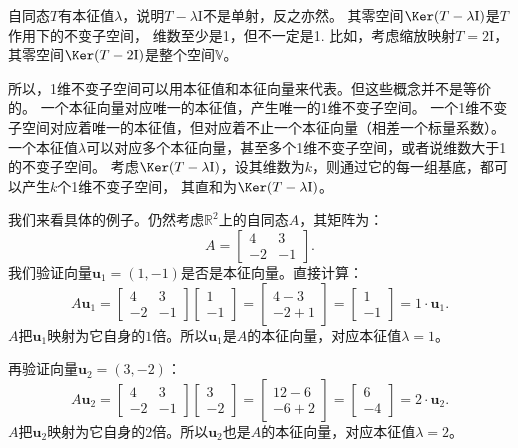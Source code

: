 \documentclass[12pt,UTF8]{ctexbook}
\begin{document}
自同态$T$有本征值$\lambda$，说明$T - \lambda \mathrm{I}$不是单射，反之亦然。
其零空间$\Ker (T - \lambda \mathrm{I})$是$T$作用下的不变子空间，
维数至少是1，但不一定是1. 比如，考虑缩放映射$T = 2\mathrm{I}$，
其零空间$\Ker (T - 2 \mathrm{I})$是整个空间$\mathbb{V}$。

所以，1维不变子空间可以用本征值和本征向量来代表。但这些概念并不是等价的。
一个本征向量对应唯一的本征值，产生唯一的1维不变子空间。
一个1维不变子空间对应着唯一的本征值，但对应着不止一个本征向量（相差一个标量系数）。
一个本征值$\lambda$可以对应多个本征向量，甚至多个1维不变子空间，或者说维数大于1的不变子空间。
考虑$\Ker (T - \lambda \mathrm{I})$，设其维数为$k$，则通过它的每一组基底，都可以产生$k$个1维不变子空间，
其直和为$\Ker (T - \lambda \mathrm{I})$。

我们来看具体的例子。仍然考虑$\mathbb{R}^2$上的自同态$A$，其矩阵为：
$$
A = \begin{bmatrix} 4 & 3 \\ -2 & -1 \end{bmatrix}.
$$
我们验证向量$\mathbf{u}_1 = (1,-1)$是否是本征向量。直接计算：
$$
A\mathbf{u}_1 = \begin{bmatrix} 4 & 3 \\ -2 & -1 \end{bmatrix}\begin{bmatrix} 1 \\ -1 \end{bmatrix} = \begin{bmatrix} 4-3 \\ -2+1 \end{bmatrix} = \begin{bmatrix} 1 \\ -1 \end{bmatrix} = 1 \cdot \mathbf{u}_1.
$$
$A$把$\mathbf{u}_1$映射为它自身的$1$倍。所以$\mathbf{u}_1$是$A$的本征向量，对应本征值$\lambda = 1$。

再验证向量$\mathbf{u}_2 = (3,-2)$：
$$
A \mathbf{u}_2 = \begin{bmatrix} 4 & 3 \\ -2 & -1 \end{bmatrix} \begin{bmatrix} 3 \\ -2 \end{bmatrix} = \begin{bmatrix} 12-6 \\ -6+2 \end{bmatrix} = \begin{bmatrix} 6 \\ -4 \end{bmatrix} = 2 \cdot \mathbf{u}_2.
$$
$A$把$\mathbf{u}_2$映射为它自身的$2$倍。所以$\mathbf{u}_2$也是$A$的本征向量，对应本征值$\lambda = 2$。
\end{document}
